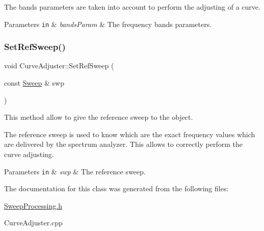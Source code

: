 The bands\textquotesingle{} parameters are taken into account to perform the adjusting of a curve. 
\begin{DoxyParams}[1]{Parameters}
\mbox{\tt in}  & {\em bands\+Param} & The frequency bands\textquotesingle{} parameters. \\
\hline
\end{DoxyParams}
\mbox{\label{classCurveAdjuster_a5865916cf99ab2cad0a7a9bc2b4e1d56}} 
\subsubsection{\texorpdfstring{Set\+Ref\+Sweep()}{SetRefSweep()}}
{\footnotesize\ttfamily void Curve\+Adjuster\+::\+Set\+Ref\+Sweep (\begin{DoxyParamCaption}\item[{const \hyperlink{structSweep}{Sweep} \&}]{swp }\end{DoxyParamCaption})\hspace{0.3cm}{\ttfamily [inline]}}



This method allow to give the reference sweep to the object. 

The reference sweep is used to know which are the exact frequency values which are delivered by the spectrum analyzer. This allows to correctly perform the curve adjusting. 
\begin{DoxyParams}[1]{Parameters}
\mbox{\tt in}  & {\em swp} & The reference sweep. \\
\hline
\end{DoxyParams}


The documentation for this class was generated from the following files\+:\begin{DoxyCompactItemize}
\item 
\hyperlink{SweepProcessing_8h}{Sweep\+Processing.\+h}\item 
Curve\+Adjuster.\+cpp\end{DoxyCompactItemize}
